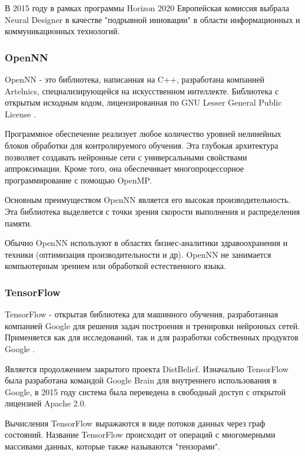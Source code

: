 В 2015 году в рамках программы Horizon 2020 Европейская комиссия выбрала Neural Designer в качестве "подрывной инновации" в области информационных и коммуникационных технологий.



\subsubsection{OpenNN}

OpenNN - это библиотека, написанная на C++, разработана компанией Artelnics, специализирующейся на искусственном интеллекте. Библиотека с открытым исходным кодом, лицензированная по GNU Lesser General Public License \cite{opennn_doc}.

Программное обеспечение реализует любое количество уровней нелинейных блоков обработки для контролируемого обучения. Эта глубокая архитектура позволяет создавать нейронные сети с универсальными свойствами аппроксимации. Кроме того, она обеспечивает многопроцессорное программирование с помощью OpenMP.

Основным преимуществом OpenNN является его высокая производительность. Эта библиотека выделяется с точки зрения скорости выполнения и распределения памяти. 

Обычно OpenNN используют в областях бизнес-аналитики  здравоохранения и техники (оптимизация производительности и др). OpenNN не занимается компьютерным зрением или обработкой естественного языка.



\subsubsection{TensorFlow}

TensorFlow - открытая  библиотека для машинного обучения, разработанная компанией Google для решения задач построения и тренировки нейронных сетей. Применяется как для исследований, так и для разработки собственных продуктов Google \cite{tf_doc}.

Является продолжением закрытого проекта DistBelief. Изначально TensorFlow была разработана командой Google Brain для внутреннего использования в Google, в 2015 году система была переведена в свободный доступ с открытой лицензией Apache 2.0.

Вычисления TensorFlow выражаются в виде потоков данных через граф состояний. Название TensorFlow происходит от операций с многомерными массивами данных, которые также называются "тензорами".

